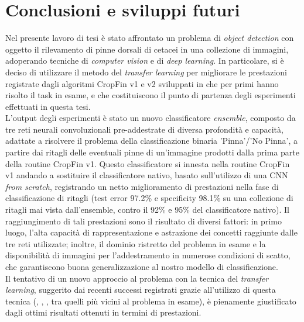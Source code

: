 \chapter{Conclusioni e sviluppi futuri}
\label{conclusioni}
Nel presente lavoro di tesi è stato affrontato un problema di \textit{object detection} con oggetto il rilevamento di pinne dorsali di cetacei in una collezione di immagini, adoperando tecniche di \textit{computer vision} e di \textit{deep learning}.
In particolare, si è deciso di utilizzare il metodo del \textit{transfer learning} per migliorare le prestazioni registrate dagli algoritmi CropFin v1 e v2 sviluppati in \cite{gianvito} che per primi hanno risolto il task in esame, e che costituiscono il punto di partenza degli esperimenti effettuati in questa tesi.\\

L'output degli esperimenti è stato un nuovo classificatore \textit{ensemble}, composto da tre reti neurali convoluzionali pre-addestrate di diversa profondità e capacità, adattate a risolvere il problema della classificazione binaria 'Pinna'/'No Pinna', a partire dai ritagli delle eventuali pinne di un'immagine prodotti dalla prima parte della routine CropFin v1. Questo classificatore si innesta nella routine CropFin v1 andando a sostituire il classificatore nativo, basato sull'utilizzo di una CNN \textit{from scratch}, registrando un netto miglioramento di prestazioni nella fase di classificazione di ritagli (test error 97.2\% e specificity 98.1\% su una collezione di ritagli mai vista dall'ensemble, contro il 92\% e 95\% del classificatore nativo). Il raggiungimento di tali prestazioni sono il risultato di diversi fattori: in primo luogo, l'alta capacità di rappresentazione e astrazione dei concetti raggiunte dalle tre reti utilizzate; inoltre, il dominio ristretto del problema in esame e la disponibilità di immagini per l'addestramento in numerose condizioni di scatto, che garantiscono buona generalizzazione al nostro modello di classificazione.\\

Il tentativo di un nuovo approccio al problema con la tecnica del \textit{transfer learning}, suggerito dai recenti successi registrati grazie all'utilizzo di questa tecnica (\cite{tl1}, \cite{tl2}, \cite{tl3}, tra quelli più vicini al problema in esame), è pienamente giustificato dagli ottimi risultati ottenuti in termini di prestazioni.\\

